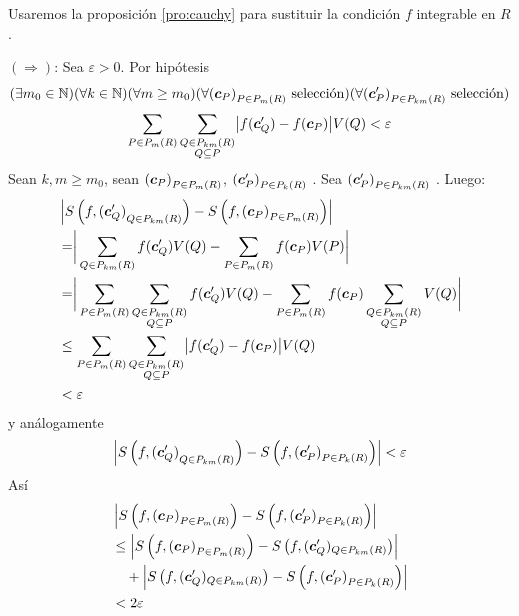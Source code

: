 \begin{demostracion}
Usaremos la proposici\'on \ref{pro:cauchy} para sustituir la condici\'on $ f $ integrable en $ R $.

$(\Rightarrow)$: Sea $ \varepsilon > 0 $. Por hip\'otesis 
\[(\exists
 m_0\in \mathbb{N}) ( \forall  k\in \mathbb{N})( \forall m \geq m_0 ) ( \forall
{(\boldsymbol{c}_P)}_{P \in P_{m}(R)} \allowbreak \text{ selecci\'on} ) ( \forall
{(\boldsymbol{c}'_P)}_{P \in P_{km}(R)} \allowbreak \text{ selecci\'on})
\]
\[    \sum_{P \in P_{m}(R)} \sum_{\substack{Q \in P_{km}(R) \\
    Q \subseteq P}} \bigr\lvert f(\boldsymbol{c}'_Q)-f(\boldsymbol{c}_P) \bigl\rvert V(Q)
            < \varepsilon 
\]
Sean $ k,m \geq m_0 $, sean $ {(\boldsymbol{c}_P)}_{P \in P_{m}(R)}$, ${(\boldsymbol{c}'_P)}_{P \in P_{k}(R)} $ \familiasEleccion{}. Sea ${(\boldsymbol{c}'_P)}_{P \in P_{km}(R)} $ \familiaEleccion{}. Luego:
\begin{align*}
&\left\lvert S\left(f,{(\boldsymbol{c}'_Q)}_{Q \in P_{km}(R)}\right) -
S\left(f,{(\boldsymbol{c}_P)}_{P \in P_{m}(R)}\right)\right\rvert \\
    &= \biggr\lvert \sum_{Q \in P_{km}(R)} f(\boldsymbol{c}'_Q) V(Q) -
        \sum_{P \in P_{m}(R)} f(\boldsymbol{c}_P) V(P) \biggl\rvert \\
    &= \biggr\lvert \sum_{P \in P_{m}(R)}
        \sum_{\substack{Q \in P_{km}(R) \\ Q \subseteq P}} f(\boldsymbol{c}'_Q) V(Q) -
        \sum_{P \in P_{m}(R)} f(\boldsymbol{c}_P)
        \sum_{\substack{Q \in P_{km}(R) \\ Q \subseteq P}} V(Q) \biggl\rvert \\
    &\leq \sum_{P \in P_{m}(R)}
        \sum_{\substack{Q \in P_{km}(R) \\ Q \subseteq P}}
        \bigr\lvert f(\boldsymbol{c}'_Q)-f(\boldsymbol{c}_P) \bigl\rvert V(Q) \\
    & < \varepsilon
\end{align*}
y an\'alogamente
\[
    \left\lvert S\left(f,{(\boldsymbol{c}'_Q)}_{Q \in P_{km}(R)}\right) - S\left(f,{(\boldsymbol{c}'_P)}_{P \in
    P_{k}(R)}\right)\right\rvert < \varepsilon
\]
As\'i
\begin{align*}
&\left\lvert S\left(f,{(\boldsymbol{c}_P)}_{P \in P_{m}(R)}\right) - S\left(f,{(\boldsymbol{c}'_P)}_{P \in P_{k}(R)}\right)\right\rvert \\
    &\leq \left\lvert S\left(f,{(\boldsymbol{c}_P)}_{P \in P_{m}(R)}\right) - S\left(f,(\boldsymbol{c}'_Q)_{Q \in
    P_{km}(R)}\right)\right\rvert \\
    &\quad + \left\lvert S\left(f,(\boldsymbol{c}'_Q)_{Q \in P_{km}(R)}\right) - S\left(f,{(\boldsymbol{c}'_P)}_{P \in P_{k}(R)}\right) \right\rvert \\
    &< 2 \varepsilon
\end{align*}


\end{demostracion}
